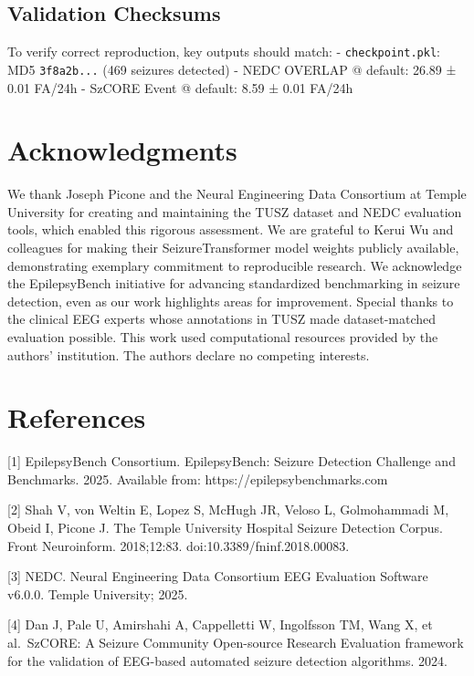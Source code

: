 \documentclass[
]{article}
\begin{document}
\hypertarget{validation-checksums}{%
\subsection{Validation Checksums}\label{validation-checksums}}

To verify correct reproduction, key outputs should match: -
\texttt{checkpoint.pkl}: MD5 \texttt{3f8a2b...} (469 seizures detected)
- NEDC OVERLAP @ default: 26.89 ± 0.01 FA/24h - SzCORE Event @ default:
8.59 ± 0.01 FA/24h

\hypertarget{acknowledgments}{%
\section{Acknowledgments}\label{acknowledgments}}

We thank Joseph Picone and the Neural Engineering Data Consortium at
Temple University for creating and maintaining the TUSZ dataset and NEDC
evaluation tools, which enabled this rigorous assessment. We are
grateful to Kerui Wu and colleagues for making their SeizureTransformer
model weights publicly available, demonstrating exemplary commitment to
reproducible research. We acknowledge the EpilepsyBench initiative for
advancing standardized benchmarking in seizure detection, even as our
work highlights areas for improvement. Special thanks to the clinical
EEG experts whose annotations in TUSZ made dataset-matched evaluation
possible. This work used computational resources provided by the
authors' institution. The authors declare no competing interests.

\hypertarget{references}{%
\section{References}\label{references}}

{[}1{]} EpilepsyBench Consortium. EpilepsyBench: Seizure Detection
Challenge and Benchmarks. 2025. Available from:
https://epilepsybenchmarks.com

{[}2{]} Shah V, von Weltin E, Lopez S, McHugh JR, Veloso L, Golmohammadi
M, Obeid I, Picone J. The Temple University Hospital Seizure Detection
Corpus. Front Neuroinform. 2018;12:83. doi:10.3389/fninf.2018.00083.

{[}3{]} NEDC. Neural Engineering Data Consortium EEG Evaluation Software
v6.0.0. Temple University; 2025.

{[}4{]} Dan J, Pale U, Amirshahi A, Cappelletti W, Ingolfsson TM, Wang
X, et al.~SzCORE: A Seizure Community Open-source Research Evaluation
framework for the validation of EEG-based automated seizure detection
algorithms. 2024.
\end{document}
